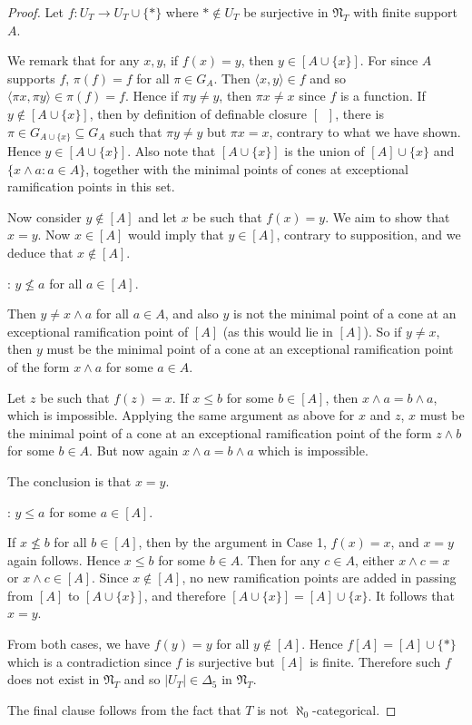 \documentclass[a4paper,reqno]{amsart}
\numberwithin{equation}{section}
\begin{document}
\begin{proof} Let $f: U_T \to U_T \cup \{*\}$ where $* \not \in U_T$ be surjective in ${\mathfrak N}_T$ with finite 
support $A$.

We remark that for any $x, y$, if $f(x) = y$, then $y \in [A \cup \{x\}]$. For since $A$ supports $f$, $\pi(f) = f$ 
for all $\pi \in G_A$. Then $\langle x, y \rangle \in f$ and so $\langle \pi x, \pi y \rangle \in \pi(f) = f$. Hence if 
$\pi y \neq y$, then $\pi x \neq x$ since $f$ is a function. If $y \not \in [A \cup \{x\}]$, then by definition of 
definable closure $[ \;\;]$, there is $\pi \in G_{A \cup \{x\}} \subseteq G_A$ such that $\pi y \neq y$ but $\pi x = x$, 
contrary to what we have shown. Hence $y \in [A \cup \{x\}]$. Also note that $[A \cup \{x\}]$ is the union of 
$[A] \cup \{x\}$ and $\{x \wedge a: a \in A\}$, together with the minimal points of cones at exceptional ramification 
points in this set. 

Now consider $y \not \in [A]$ and let $x$ be such that $f(x) = y$. We aim to show that $x = y$. Now $x \in [A]$ would imply 
that $y \in [A]$, contrary to supposition, and we deduce that $x \not \in [A]$.

: $y \not \le a$ for all $a \in [A]$.

Then $y \neq x \wedge a$ for all $a \in A$, and also $y$ is not the minimal point of a cone at an exceptional ramification 
point of $[A]$ (as this would lie in $[A]$). So if $y \neq x$, then $y$ must be the minimal point of a cone at an exceptional
ramification point of the form $x \wedge a$ for some $a \in A$. 

Let $z$ be such that $f(z) = x$. If $x \le b$ for some $b \in [A]$, then $x \wedge a = b \wedge a$, which is impossible.
Applying the same argument as above for $x$ and $z$, $x$ must be the minimal point of a cone at an exceptional ramification
point of the form $z \wedge b$ for some $b \in A$. But now again $x \wedge a = b \wedge a$ which is impossible.

The conclusion is that $x = y$.

: $y \le a$ for some $a \in [A]$.

If $x \not \le b$ for all $b \in [A]$, then by the argument in Case 1, $f(x) = x$, and $x = y$ again follows. Hence $x \le b$
for some $b \in A$. Then for any $c \in A$, either $x \wedge c = x$ or $x \wedge c \in [A]$. Since $x \not \in [A]$, no new
ramification points are added in passing from $[A]$ to $[A \cup \{x\}]$, and therefore $[A \cup \{x\}] = [A] \cup \{x\}$. It 
follows that $x = y$. 

From both cases, we have $f(y) = y$ for all $y \not \in [A]$. Hence $f[A] = [A] \cup \{*\}$ which is a 
contradiction since $f$ is surjective but $[A]$ is finite. Therefore such $f$ does not exist
in ${\mathfrak N}_T$ and so $|U_T| \in \Delta_5$ in ${\mathfrak N}_T$.  

The final clause follows from the fact that $T$ is not $\aleph_0$-categorical.  \end{proof}
\end{document}
